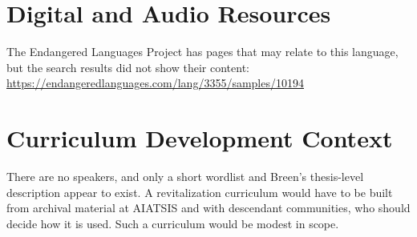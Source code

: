 \documentclass[12pt]{article}
\begin{document}
\section{Digital and Audio Resources}
The Endangered Languages Project has pages that may relate to this language, but the search results did not show their content: \url{https://endangeredlanguages.com/lang/3355/samples/10194}

\section{Curriculum Development Context}
There are no speakers, and only a short wordlist and Breen's thesis-level description appear to exist. A revitalization curriculum would have to be built from archival material at AIATSIS and with descendant communities, who should decide how it is used. Such a curriculum would be modest in scope.
\end{document}
